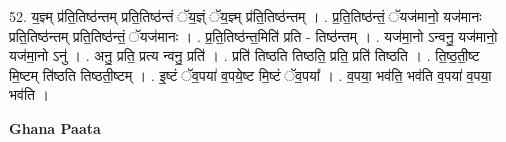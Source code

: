 \documentclass[17pt]{extarticle}
\begin{document}
52. य॒ज्ञ्म् प्र॑ति॒तिष्ठ॑न्तम् प्रति॒तिष्ठ॑न्तं ॅय॒ज्ञ्ं ॅय॒ज्ञ्म् प्र॑ति॒तिष्ठ॑न्तम् । . प्र॒ति॒तिष्ठ॑न्तं॒ ॅयज॑मानो॒ यज॑मानः प्रति॒तिष्ठ॑न्तम् प्रति॒तिष्ठ॑न्तं॒ ॅयज॑मानः । . प्र॒ति॒तिष्ठ॑न्त॒मिति॑ प्रति - तिष्ठ॑न्तम् । . यज॑मा॒नो ऽन्वनु॒ यज॑मानो॒ यज॑मा॒नो ऽनु॑ । . अनु॒ प्रति॒ प्रत्य न्वनु॒ प्रति॑ । . प्रति॑ तिष्ठति तिष्ठति॒ प्रति॒ प्रति॑ तिष्ठति । . ति॒ष्ठ॒ती॒ष्ट मि॒ष्टम् ति॑ष्ठति तिष्ठती॒ष्टम् । . इ॒ष्टं ॅव॒पया॑ व॒पये॒ष्ट मि॒ष्टं ॅव॒पया᳚ । . व॒पया॒ भव॑ति॒ भव॑ति व॒पया॑ व॒पया॒ भव॑ति । \newline

\textbf{Ghana Paata } \newline
\end{document}
